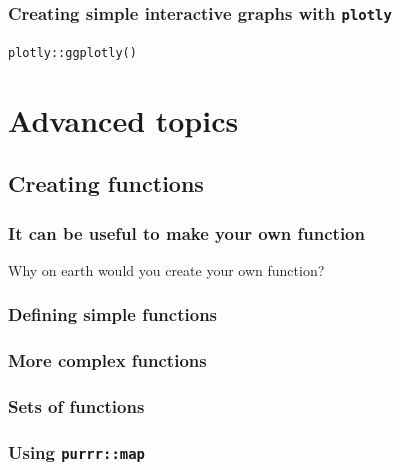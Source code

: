 \documentclass[
]{book}
\begin{document}
\hypertarget{creating-simple-interactive-graphs-with-plotly}{%
\section{\texorpdfstring{Creating simple interactive graphs with \texttt{plotly}}{Creating simple interactive graphs with plotly}}\label{creating-simple-interactive-graphs-with-plotly}}

\texttt{plotly::ggplotly()}

\hypertarget{part-advanced-topics}{%
\part{Advanced topics}\label{part-advanced-topics}}

\hypertarget{creating-functions}{%
\chapter{Creating functions}\label{creating-functions}}

\hypertarget{it-can-be-useful-to-make-your-own-function}{%
\section{It can be useful to make your own function}\label{it-can-be-useful-to-make-your-own-function}}

Why on earth would you create your own function?

\hypertarget{defining-simple-functions}{%
\section{Defining simple functions}\label{defining-simple-functions}}

\hypertarget{more-complex-functions}{%
\section{More complex functions}\label{more-complex-functions}}

\hypertarget{sets-of-functions}{%
\section{Sets of functions}\label{sets-of-functions}}

\hypertarget{using-purrrmap}{%
\section{\texorpdfstring{Using \texttt{purrr::map}}{Using purrr::map}}\label{using-purrrmap}}
\end{document}
